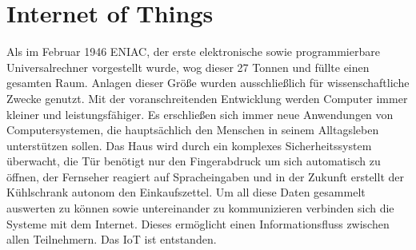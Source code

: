 \chapter{Internet of Things}\label{c:IoT}

Als im Februar 1946 ENIAC, der erste elektronische sowie programmierbare Universalrechner vorgestellt wurde, wog dieser 27 Tonnen und füllte einen gesamten Raum. Anlagen dieser Größe wurden ausschließlich für wissenschaftliche Zwecke genutzt.
Mit der voranschreitenden Entwicklung werden Computer immer kleiner und leistungsfähiger. Es erschließen sich immer neue Anwendungen von Computersystemen, die hauptsächlich den Menschen in seinem Alltagsleben unterstützen sollen.
Das Haus wird durch ein komplexes Sicherheitssystem überwacht, die Tür benötigt nur den Fingerabdruck um sich automatisch zu öffnen, der Fernseher reagiert auf Spracheingaben und in der Zukunft erstellt der Kühlschrank autonom den Einkaufszettel.
Um all diese Daten gesammelt auswerten zu können sowie untereinander zu kommunizieren verbinden sich die Systeme mit dem Internet. Dieses ermöglicht einen Informationsfluss zwischen allen Teilnehmern. 
Das IoT ist entstanden.




